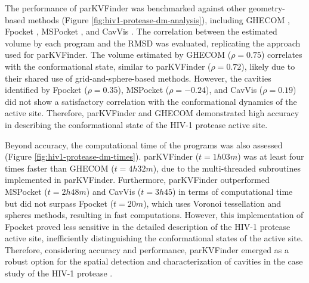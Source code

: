 \documentclass[Ingles]{phdthesis}
\begin{document}
The performance of parKVFinder \cite{guerra2020} was benchmarked against other geometry-based methods (Figure \ref{fig:hiv1-protease-dm-analysis}), including GHECOM \cite{ghecom}, Fpocket \cite{fpocket}, MSPocket \cite{mspocket}, and CavVis \cite{cavvis}. The correlation between the estimated volume by each program and the \acs{RMSD} was evaluated, replicating the approach used for parKVFinder. The volume estimated by GHECOM ($\rho=0.75$) correlates with the conformational state, similar to parKVFinder ($\rho=0.72$), likely due to their shared use of grid-and-sphere-based methods. However, the cavities identified by Fpocket ($\rho=0.35$), MSPocket ($\rho=-0.24$), and CavVis ($\rho=0.19$) did not show a satisfactory correlation with the conformational dynamics of the active site. Therefore, parKVFinder and GHECOM demonstrated high accuracy in describing the conformational state of the HIV-1 protease active site.

Beyond accuracy, the computational time of the programs was also assessed (Figure \ref{fig:hiv1-protease-dm-times}). parKVFinder ($t=1h03m$) was at least four times faster than GHECOM ($t=4h32m$), due to the multi-threaded subroutines implemented in parKVFinder. Furthermore, parKVFinder outperformed MSPocket ($t=2h48m$) and CavVis ($t=3h45$) in terms of computational time but did not surpass Fpocket ($t=20m$), which uses Voronoi tessellation and \textalpha\space spheres methods, resulting in fast computations. However, this implementation of Fpocket proved less sensitive in the detailed description of the HIV-1 protease active site, inefficiently distinguishing the conformational states of the active site. Therefore, considering accuracy and performance, parKVFinder emerged as a robust option for the spatial detection and characterization of cavities in the case study of the HIV-1 protease \cite{guerra2020}.
\end{document}
